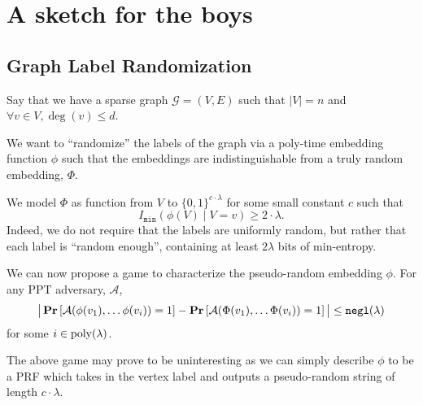 \section{A sketch for the boys}
\newcommand{\graph}{\mathcal{G}}
\newcommand{\verts}{V}
\newcommand{\inner}{\texttt{inner}}
\newcommand{\edges}{E}
\newcommand{\maxDeg}{d}
\newcommand{\nVerts}{n}
\newcommand{\embedFn}{\phi}
\newcommand{\idealEmbedFn}{\Phi}
\newcommand{\circNeigb}{C_\Gamma}
\newcommand{\MPK}{\text{MPK}}
\newcommand{\MSK}{\text{MSK}}
\newcommand{\SK}{\text{SK}}

\newcommand{\advers}{\mathcal{A}}
\newcommand{\PRF}{\texttt{PRF}}
\newcommand{\Enc}{\texttt{Enc}}
\newcommand{\Dec}{\texttt{Dec}}
\newcommand{\Hyb}{\texttt{Hyb}}

\newcommand{\minEntropy}{I_\texttt{min}}

\subsection{Graph Label Randomization}
Say that we have a sparse graph $\graph = (\verts, \edges)$ such that $|\verts| = n$
and $\forall v \in \verts, \deg(v) \leq d$.

We want to ``randomize'' the labels of the graph via a poly-time embedding function $\phi$
such that the embeddings are indistinguishable from a truly random embedding, $\idealEmbedFn$.

We model $\idealEmbedFn$ as function from $\verts$ to $\{0, 1\}^{c \cdot \lambda}$ for some small constant $c$
such that 
\begin{equation*}
	\minEntropy(\phi(V) \mid V = v) \geq 2 \cdot \lambda.
\end{equation*}
Indeed, we do not require that the labels are uniformly random, but rather that each label is ``random enough'',
containing at least $2 \lambda$ bits of min-entropy.


We can now propose a game to characterize the pseudo-random embedding $\phi$.
For any PPT adversary, $\advers$,
\begin{equation}
	\big|
		\Pr\left[\advers(\phi(v_1), \dots \phi(v_{i})) = 1\right]
		 - 
		\Pr\left[\advers(\idealEmbedFn(v_1), \dots \idealEmbedFn(v_{i})) = 1\right]
	\big|
		\leq \negl(\lambda)
\end{equation}
for some $i \in \operatorname{poly}(\lambda)$.

The above game may prove to be uninteresting as we can simply describe $\phi$ to be a PRF 
which takes in the vertex label and outputs a pseudo-random string of length $c \cdot \lambda$.

